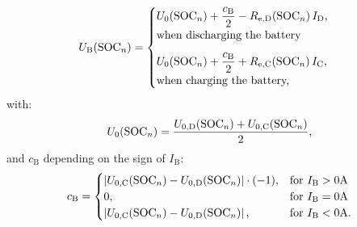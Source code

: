 \begin{equation} \label{eq:battery_voltage_adapted}
	\centering
		U_\mathrm{B}(\mathrm{SOC}_n) =
  		\begin{cases}
   			U_0 (\mathrm{SOC}_n)+ \dfrac{c_{\mathrm{B}}}{2} - R_{\mathrm{e,D}}(\mathrm{SOC}_n) \, I_\mathrm{D}\text{,} \\ \text{when discharging the battery} \\[8pt]
    		U_0(\mathrm{SOC}_n) + \dfrac{c_{\mathrm{B}}}{2} + R_{\mathrm{e,C}}(\mathrm{SOC}_n) \, I_\mathrm{C}\text{,} \\\text{when charging the battery,}
  		\end{cases}
	\end{equation} 
with: 
\begin{equation} \label{eq:U_0}
	\centering
	U_0(\mathrm{SOC}_n) = \dfrac{U_{0,\mathrm{D}}(\mathrm{SOC}_n) + U_{0,\mathrm{C}}(\mathrm{SOC}_n)}{2}\text{,}
\end{equation}
and $c_{\mathrm{B}}$ depending on the sign of $I_\mathrm{B}$:
\begin{equation} \label{eq:c_B}
	\centering
		c_{\mathrm{B}} =
  		\begin{cases}
   			\left| U_{0, \mathrm{C}}(\mathrm{SOC}_n) - U_{0, \mathrm{D}}(\mathrm{SOC}_n) \right| \cdot (-1) \text{,} & \text{for } I_\mathrm{B} > 0\mathrm{A} \\
			0\text{,} & \text{for } I_\mathrm{B} = 0\mathrm{A} \\
			\left| U_{0, \mathrm{C}}(\mathrm{SOC}_n) - U_{0, \mathrm{D}}(\mathrm{SOC}_n) \right| \text{,} & \text{for } I_\mathrm{B} < 0\mathrm{A}\text{.}
  		\end{cases}
	\end{equation} 


